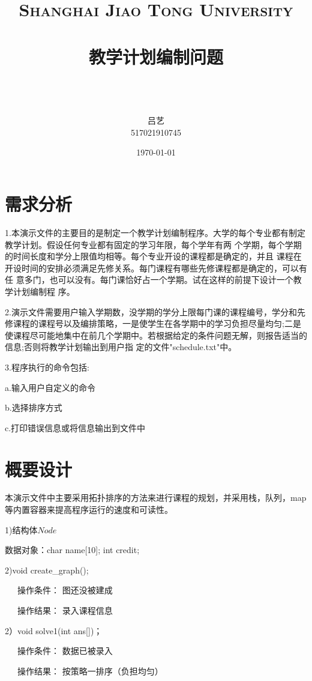 \documentclass[paper=a4,UTF8,fontsize=11pt]{scrartcl} %
\title{
\normalfont \normalsize
\textsc{Shanghai Jiao Tong University} \\ [25pt] %
\horrule{0.5pt} \\[0.4cm] %
\huge \kaishu 教学计划编制问题 \\ %
\horrule{2pt} \\[0.5cm] %
}
\author{\\ \kaishu 吕艺\\ \normalsize 517021910745} %
\date{\normalsize\today} %
\numberwithin{equation}{section} %
\numberwithin{figure}{section} %
\numberwithin{table}{section} %
\begin{document}
\maketitle %
\kaishu
\section{需求分析}

1.本演示文件的主要目的是制定一个教学计划编制程序。大学的每个专业都有制定教学计划。假设任何专业都有固定的学习年限，每个学年有两
个学期，每个学期的时间长度和学分上限值均相等。每个专业开设的课程都是确定的，并且 课程在开设时间的安排必须满足先修关系。每门课程有哪些先修课程都是确定的，可以有任 意多门，也可以没有。每门课恰好占一个学期。试在这样的前提下设计一个教学计划编制程 序。
\vspace{0.5cm}

2.演示文件需要用户输入学期数，没学期的学分上限每门课的课程编号，学分和先修课程的课程号以及编排策略，一是使学生在各学期中的学习负担尽量均匀;二是使课程尽可能地集中在前几个学期中。若根据给定的条件问题无解，则报告适当的信息;否则将教学计划输出到用户指
定的文件"schedule.txt"中。
\vspace{0.5cm}

3.程序执行的命令包括:

a.输入用户自定义的命令

b.选择排序方式

c.打印错误信息或将信息输出到文件中

\vspace{0.5cm}

\section{概要设计}
本演示文件中主要采用拓扑排序的方法来进行课程的规划，并采用栈，队列，map等内置容器来提高程序运行的速度和可读性。

1)结构体$Node$

数据对象：char name[10];	\qquad \qquad \qquad int  credit; 

2)void create\_graph();

\qquad \qquad \quad \ \ \ 操作条件： 图还没被建成

\qquad \qquad \quad \ \ \ 操作结果： 录入课程信息

2）void solve1(int ans[])；   

\qquad \qquad \quad \ \ \ 操作条件： 数据已被录入

\qquad \qquad \quad \ \ \ 操作结果： 按策略一排序（负担均匀）
\end{document}
